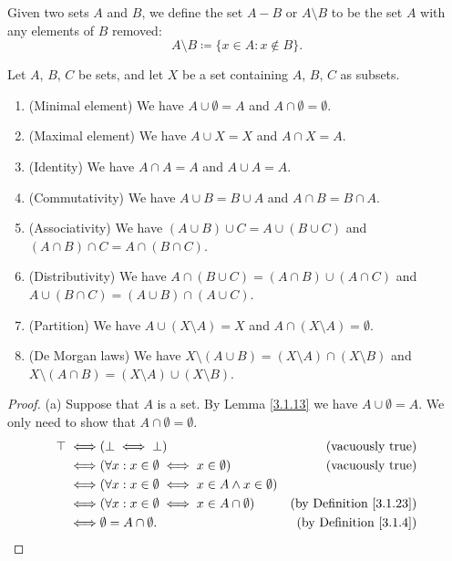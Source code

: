 \setcounter{theorem}{26}
\begin{definition}\label{3.1.27}
    Given two sets \(A\) and \(B\), we define the set \(A - B\) or \(A \setminus B\) to be the set \(A\) with any elements of \(B\) removed:
    \[
        A \setminus B \coloneqq \{x \in A : x \notin B\}.
    \]
\end{definition}

\begin{proposition}\label{3.1.28}
    Let \(A\), \(B\), \(C\) be sets, and let \(X\) be a set containing \(A\), \(B\), \(C\) as subsets.
    \begin{enumerate}
        \item (Minimal element) We have \(A \cup \emptyset = A\) and \(A \cap \emptyset = \emptyset\).
        \item (Maximal element) We have \(A \cup X = X\) and \(A \cap X = A\).
        \item (Identity) We have \(A \cap A = A\) and \(A \cup A = A\).
        \item (Commutativity) We have \(A \cup B = B \cup A\) and \(A \cap B = B \cap A\).
        \item (Associativity) We have \((A \cup B) \cup C = A \cup (B \cup C)\) and \((A \cap B) \cap C = A \cap (B \cap C)\).
        \item (Distributivity) We have \(A \cap (B \cup C) = (A \cap B) \cup (A \cap C)\) and \(A \cup (B \cap C) = (A \cup B) \cap (A \cup C)\).
        \item (Partition) We have \(A \cup (X \setminus A) = X\) and \(A \cap (X \setminus A) = \emptyset\).
        \item (De Morgan laws) We have \(X \setminus (A \cup B) = (X \setminus A) \cap (X \setminus B)\) and \(X \setminus (A \cap B) = (X \setminus A) \cup (X \setminus B)\).
    \end{enumerate}
\end{proposition}

\begin{proof}{(a)}
    Suppose that \(A\) is a set.
    By Lemma \ref{3.1.13} we have \(A \cup \emptyset = A\).
    We only need to show that \(A \cap \emptyset = \emptyset\).
    \begin{align*}
        \top \iff & (\bot \iff \bot)                                                 & \text{(vacuously true)}             \\
        \iff      & (\forall x : x \in \emptyset \iff x \in \emptyset)               & \text{(vacuously true)}             \\
        \iff      & (\forall x : x \in \emptyset \iff x \in A \land x \in \emptyset)                                       \\
        \iff      & (\forall x : x \in \emptyset \iff x \in A \cap \emptyset)        & \text{(by Definition \ref{3.1.23})} \\
        \iff      & \emptyset = A \cap \emptyset.                                    & \text{(by Definition \ref{3.1.4})}
    \end{align*}
\end{proof}

